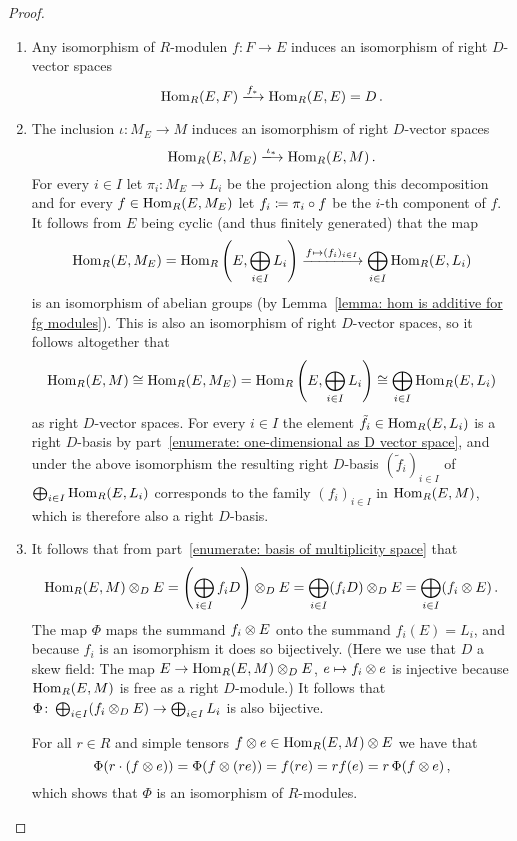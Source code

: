 \begin{proof}
  \leavevmode
  \begin{enumerate}
    \item
      Any isomorphism of $R$-modulen $f \colon F \to E$ induces an isomorphism of right $D$-vector spaces
      \[
                              \Hom_R(E,F)
        \xlongrightarrow{f_*} \Hom_R(E,E)
        =                     D \,.
      \]
    \item
      The inclusion $\iota \colon M_E \to M$ induces an isomorphism of right $D$-vector spaces
      \[
                                  \Hom_R(E, M_E)
        \xlongrightarrow{\iota_*} \Hom_R(E, M) \,.
      \]
      For every $i \in I$ let $\pi_i \colon M_E \to L_i$ be the projection along this decomposition and for every $f \in \operatorname{Hom}_R(E,M_E)$ let $f_i \coloneqq \pi_i \circ f$ be the $i$-th component of $f$.
      It follows from $E$ being cyclic (and thus finitely generated) that the map
      \[
              \Hom_R(E, M_E)
        =     \Hom_R\left(E, \bigoplus_{i \in I} L_i \right)
        \xlongrightarrow{f \mapsto (f_i)_{i \in I}}
              \bigoplus_{i \in I} \Hom_R(E, L_i)
      \]
      is an isomorphism of abelian groups (by Lemma~\ref{lemma: hom is additive for fg modules}).
      This is also an isomorphism of right $D$-vector spaces, so it follows altogether that
      \[
              \operatorname{Hom}_R(E, M)
        \cong \operatorname{Hom}_R(E, M_E)
        =     \operatorname{Hom}_R\left( E, \bigoplus_{i \in I} L_i \right)
        \cong \bigoplus_{i \in I} \operatorname{Hom}_R(E, L_i)
      \]
      as right $D$-vector spaces.
      For every $i \in I$ the element $\tilde{f}_i \in \operatorname{Hom}_R(E, L_i)$ is a right $D$-basis by part~\ref*{enumerate: one-dimensional as D vector space}, and under the above isomorphism the resulting right $D$-basis $(\tilde{f}_i)_{i \in I}$ of $\bigoplus_{i \in I} \operatorname{Hom}_R(E, L_i)$ corresponds to the family $(f_i)_{i \in I}$ in $\operatorname{Hom}_R(E,M)$, which is therefore also a right $D$-basis.
    \item
      It follows that from part~\ref*{enumerate: basis of multiplicity space} that
      \[
          \operatorname{Hom}_R(E, M) \mathbin{\otimes}_D E
        = \left( \bigoplus_{i \in I} f_i D \right) \mathbin{\otimes}_D E
        = \bigoplus_{i \in I} (f_i D) \mathbin{\otimes}_D E
        = \bigoplus_{i \in I} (f_i \mathbin{\otimes} E) \,.
      \]
      The map $\Phi$ maps the summand $f_i \mathbin{\otimes} E$ onto the summand $f_i(E) = L_i$, and because $f_i$ is an isomorphism it does so bijectively.
      (Here we use that $D$ a skew field:
      The map $E \to \operatorname{Hom}_R(E, M) \mathbin{\otimes}_D E$, $e \mapsto f_i \mathbin{\otimes} e$ is injective because $\operatorname{Hom}_R(E,M)$ is free as a right $D$-module.)
      It follows that $\Phi \colon \bigoplus_{i \in I} (f_i \mathbin{\otimes}_D E) \to \bigoplus_{i \in I} L_i$ is also bijective.
      
      For all $r \in R$ and simple tensors $f \mathbin{\otimes} e \in \operatorname{Hom}_R(E,M) \mathbin{\otimes} E$ we have that
      \[
          \Phi(r \cdot (f \mathbin{\otimes} e))
        = \Phi(f \mathbin{\otimes} (re))
        = f(re)
        = r f(e)
        = r \, \Phi(f \mathbin{\otimes} e) \,,
      \]
      which shows that $\Phi$ is an isomorphism of $R$-modules.
    \qedhere
  \end{enumerate}
\end{proof}


